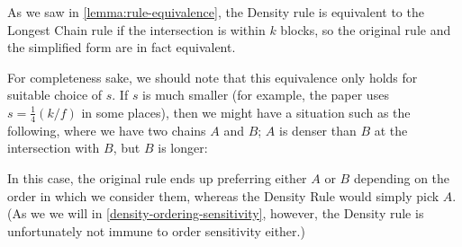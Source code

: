 As we saw in \cref{lemma:rule-equivalence}, the Density rule is equivalent
to the Longest Chain rule if the intersection is within $k$ blocks, so the
original rule and the simplified form are in fact equivalent.

For completeness sake, we should note that this equivalence only holds for
suitable choice of $s$. If $s$ is much smaller (for example, the paper uses $s =
\frac{1}{4}(k/f)$ in some places), then we might have a situation such as the
following, where we have two chains $A$ and $B$; $A$ is denser than $B$ at the
intersection with $B$, but $B$ is longer:
%
\begin{center}
\end{center}
%
In this case, the original rule ends up preferring either $A$ or $B$ depending
on the order in which we consider them, whereas the Density Rule would simply
pick $A$. (As we we will in \cref{density-ordering-sensitivity}, however, the
Density rule is unfortunately not immune to order sensitivity either.)

